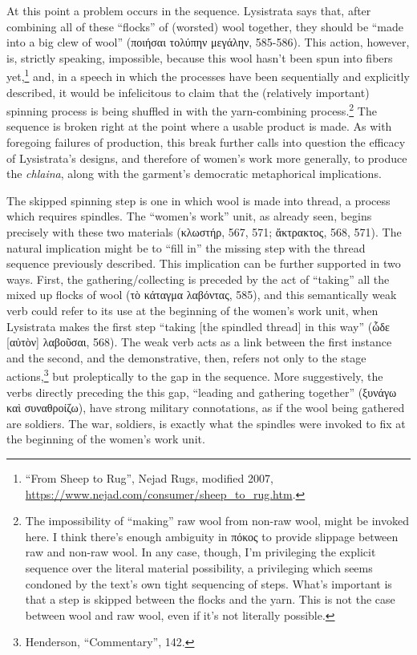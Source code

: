 \documentclass[12pt]{article}
\begin{document}
At this point a problem occurs in the sequence. Lysistrata says that, after combining all of these ``flocks'' of (worsted) wool together, they should be ``made into a big clew of wool'' (ποιήσαι τολύπην μεγάλην, 585-586). This action, however, is, strictly speaking, impossible, because this wool hasn't been spun into fibers yet,\footnote{``From Sheep to Rug'', Nejad Rugs, modified 2007, \url{https://www.nejad.com/consumer/sheep\_to\_rug.htm}.} and, in a speech in which the processes have been sequentially and explicitly described, it would be infelicitous to claim that the (relatively important) spinning process is being shuffled in with the yarn-combining process.\footnote{The impossibility of ``making'' raw wool from non-raw wool, might be invoked here. I think there's enough ambiguity in πόκος to provide slippage between raw and non-raw wool. In any case, though, I'm privileging the explicit sequence over the literal material possibility, a privileging which seems condoned by the text's own tight sequencing of steps. What's important is that a step is skipped between the flocks and the yarn. This is not the case between wool and raw wool, even if it's not literally possible.} The sequence is broken right at the point where a usable product is made. As with foregoing failures of production, this break further calls into question the efficacy of Lysistrata's designs, and therefore of women's work more generally, to produce the \textit{chlaina}, along with the garment's democratic metaphorical implications.

The skipped spinning step is one in which wool is made into thread, a process which requires spindles. The ``women's work'' unit, as already seen, begins precisely with these two materials (κλωστήρ, 567, 571; ἄκτρακτος, 568, 571). The natural implication might be to ``fill in'' the missing step with the thread sequence previously described. This implication can be further supported in two ways. First, the gathering/collecting is preceded by the act of ``taking'' all the mixed up flocks of wool (τὸ κάταγμα λαβόντας, 585), and this semantically weak verb could refer to its use at the beginning of the women's work unit, when Lysistrata makes the first step ``taking [the spindled thread] in this way'' (ὧδε [αὐτὸν] λαβοῦσαι, 568). The weak verb acts as a link between the first instance and the second, and the demonstrative, then, refers not only to the stage actions,\footnote{Henderson, ``Commentary'', 142.} but proleptically to the gap in the sequence. More suggestively, the verbs directly preceding the this gap, ``leading and gathering together'' (ξυνάγω καὶ συναθροίζω), have strong military connotations, as if the wool being gathered are soldiers. The war, soldiers, is exactly what the spindles were invoked to fix at the beginning of the women's work unit.
\end{document}
